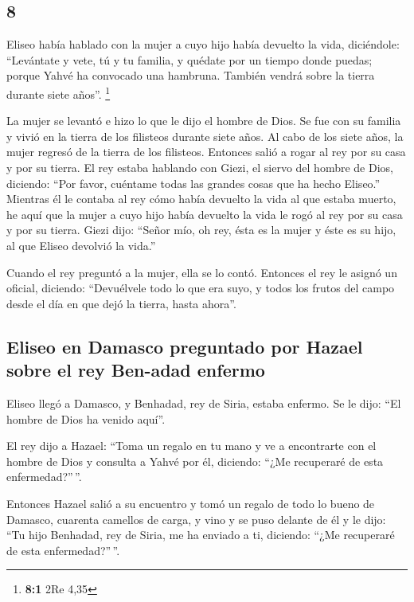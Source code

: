 \begin{paracol}{2}
\hypertarget{section-14}{%
\section{8}\label{section-14}}

 Eliseo había hablado con la mujer a cuyo hijo había
devuelto la vida, diciéndole: ``Levántate y vete, tú y tu familia, y
quédate por un tiempo donde puedas; porque Yahvé ha convocado una
hambruna. También vendrá sobre la tierra durante siete años''.
\footnote{\textbf{8:1} 2Re 4,35}

 La mujer se levantó e hizo lo que le dijo el hombre de
Dios. Se fue con su familia y vivió en la tierra de los filisteos
durante siete años.  Al cabo de los siete años, la mujer
regresó de la tierra de los filisteos. Entonces salió a rogar al rey por
su casa y por su tierra.  El rey estaba hablando con
Giezi, el siervo del hombre de Dios, diciendo: ``Por favor, cuéntame
todas las grandes cosas que ha hecho Eliseo.''  Mientras
él le contaba al rey cómo había devuelto la vida al que estaba muerto,
he aquí que la mujer a cuyo hijo había devuelto la vida le rogó al rey
por su casa y por su tierra. Giezi dijo: ``Señor mío, oh rey, ésta es la
mujer y éste es su hijo, al que Eliseo devolvió la vida.''

 Cuando el rey preguntó a la mujer, ella se lo contó.
Entonces el rey le asignó un oficial, diciendo: ``Devuélvele todo lo que
era suyo, y todos los frutos del campo desde el día en que dejó la
tierra, hasta ahora''.

\hypertarget{eliseo-en-damasco-preguntado-por-hazael-sobre-el-rey-ben-adad-enfermo}{%
\subsection{Eliseo en Damasco preguntado por Hazael sobre el rey
Ben-adad
enfermo}\label{eliseo-en-damasco-preguntado-por-hazael-sobre-el-rey-ben-adad-enfermo}}

 Eliseo llegó a Damasco, y Benhadad, rey de Siria, estaba
enfermo. Se le dijo: ``El hombre de Dios ha venido aquí''.

 El rey dijo a Hazael: ``Toma un regalo en tu mano y ve a
encontrarte con el hombre de Dios y consulta a Yahvé por él, diciendo:
``¿Me recuperaré de esta enfermedad?''\,''.

 Entonces Hazael salió a su encuentro y tomó un regalo de
todo lo bueno de Damasco, cuarenta camellos de carga, y vino y se puso
delante de él y le dijo: ``Tu hijo Benhadad, rey de Siria, me ha enviado
a ti, diciendo: ``¿Me recuperaré de esta enfermedad?''\,''.


\end{paracol}
